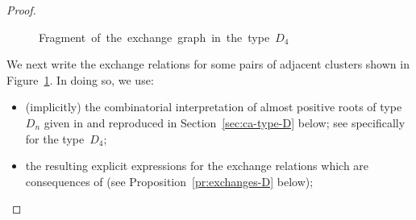 \documentclass[letterpaper]{amsart}
\numberwithin{equation}{section}
\theoremstyle{definition}
\begin{document}
\begin{proof}
\begin{figure}[ht]
\begin{center}
\begin{picture}
 
 
\end{picture} 
\end{center} 
\caption{\hbox{Fragment of the exchange graph in the %
type~$D_4$}} 
\label{fig:pentagons-D4} 
\end{figure} 
 
\pagebreak[2] 
 
We next write the exchange relations 
for some pairs of adjacent clusters shown in Figure~\ref{fig:pentagons-D4}. 
In doing so, we use: 
\begin{itemize} 
\item 
(implicitly) the  combinatorial 
interpretation of almost positive roots of type $D_n$ 
given in \cite[Section~3.5]{yga} and reproduced in Section~\ref{sec:ca-type-D} below; 
see specifically \cite[Figure~7]{yga} for the type~$D_4$; 
 
\item 
the resulting explicit expressions for the exchange relations 
which are consequences of \cite[Lemma~4.6]{cfz} 
(see Proposition~\ref{pr:exchanges-D} below); 
 

\end{itemize}
\end{proof}
\end{document}
